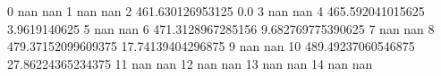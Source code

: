 0 nan nan
1 nan nan
2 461.630126953125 0.0
3 nan nan
4 465.592041015625 3.9619140625
5 nan nan
6 471.3128967285156 9.682769775390625
7 nan nan
8 479.37152099609375 17.74139404296875
9 nan nan
10 489.49237060546875 27.86224365234375
11 nan nan
12 nan nan
13 nan nan
14 nan nan
